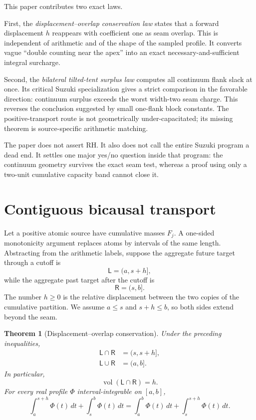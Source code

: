 \documentclass[11pt]{article}
\newtheorem{theorem}{Theorem}[section]
\newcommand{\Ioc}[2]{(#1,#2]}
\newcommand{\vol}{\operatorname{vol}}
\begin{document}
This paper contributes two exact laws.

First, the \emph{displacement--overlap conservation law} states that a forward displacement $h$
reappears with coefficient one as seam overlap.  This is independent of arithmetic and of the
shape of the sampled profile.  It converts vague ``double counting near the apex'' into an exact
necessary-and-sufficient integral surcharge.

Second, the \emph{bilateral tilted-tent surplus law} computes all continuum flank slack at once.
Its critical Suzuki specialization gives a strict comparison in the favorable direction:
continuum surplus exceeds the worst width-two seam charge.  This reverses the conclusion suggested
by small one-flank block constants.  The positive-transport route is not geometrically
under-capacitated; its missing theorem is source-specific arithmetic matching.

The paper does not assert RH.  It also does not call the entire Suzuki program a dead end.  It
settles one major yes/no question inside that program: the continuum geometry survives the exact
seam test, whereas a proof using only a two-unit cumulative capacity band cannot close it.

\section{Contiguous bicausal transport}

Let a positive atomic source have cumulative masses $F_j$.  A one-sided monotonicity argument
replaces atoms by intervals of the same length.  Abstracting from the arithmetic labels, suppose
the aggregate future target through a cutoff is
\[
 \mathsf L=\Ioc{a}{s+h},
\]
while the aggregate past target after the cutoff is
\[
 \mathsf R=\Ioc{s}{b}.
\]
The number $h\ge0$ is the relative displacement between the two copies of the cumulative
partition.  We assume $a\le s$ and $s+h\le b$, so both sides extend beyond the seam.

\begin{theorem}[Displacement--overlap conservation]\label{thm:overlap}
Under the preceding inequalities,
\begin{align}
 \mathsf L\cap\mathsf R&=\Ioc{s}{s+h},\label{eq:intersection}\\
 \mathsf L\cup\mathsf R&=\Ioc{a}{b}.\label{eq:union}
\end{align}
In particular,
\[
 \vol(\mathsf L\cap\mathsf R)=h.
\]
For every real profile $\Phi$ interval-integrable on $[a,b]$,
\begin{equation}\label{eq:integral-ledger}
 \int_a^{s+h}\Phi(t)\,dt+\int_s^b\Phi(t)\,dt
 =\int_a^b\Phi(t)\,dt+\int_s^{s+h}\Phi(t)\,dt.
\end{equation}
\end{theorem}
\end{document}
